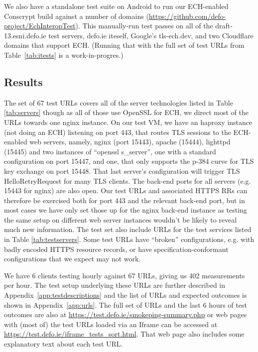 We also have a standalone test suite on Android to run our ECH-enabled
Conscrypt build against a number of domains
(\url{https://github.com/defo-project/EchInteropTest}).  This manually-run test
passes on all of the draft-13.esni.defo.ie test servers, defo.ie iteself,
Google's tls-ech.dev, and two Cloudflare domains that support ECH. (Running
that with the full set of test URLs from Table~\ref{tab:itests} is a
work-in-progres.)

\subsection{Results}

The set of 67 test URLs covers all of the server technologies listed in Table
\ref{tab:servers} though as all of those use OpenSSL for ECH, we direct most
of the URLs towards one nginx instance. On our test VM, we have an haproxy
instance (not doing an ECH) listening on port 443, that routes TLS sessions to
the ECH-enabled web servers, namely, nginx (port 15443), apache (15444),
lighttpd (15445) and two instances of ``openssl s\_server'', one with a
standard configuration on port 15447, and one, that only supports the p-384
curve for TLS key exchange on port 15448. That last server's configuration will
trigger TLS HelloRetryRequest for many TLS clients. The back-end ports for all
servers (e.g. 15443 for nginx) are also open. Our test URLs and associated
HTTPS RRs can therefore be exercised both for port 443 and the relevant
back-end port, but in most cases we have only set those up for the nginx
back-end instance as testing the same setup on different web server instances
wouldn't be likely to reveal much new information.  The test set also include
URLs for the test services listed in Table \ref{tab:testservers}.  Some test
URLs have ``broken'' configurations, e.g. with badly encoded HTTPS resource
records, or have specification-conformant configurations that we expect may not
work.

We have 6 clients testing hourly against 67 URLs, giving us 402 measurements
per hour. The test setup underlying these URLs are further described in
Appendix~\ref{app:testdescriptions} and the list of URLs and expected outcomes
is shown in Appendix~\ref{app:urls}.  The full set of URLs and the last 6 hours
of test outcomes are also at \url{https://test.defo.ie/smokeping-summary.php}
or web pages with (most of) the test URLs loaded via an Iframe can be accessed
at \url{https://test.defo.ie/iframe_tests_sort.html}. That web page also
includes some explanatory text about each test URL.

